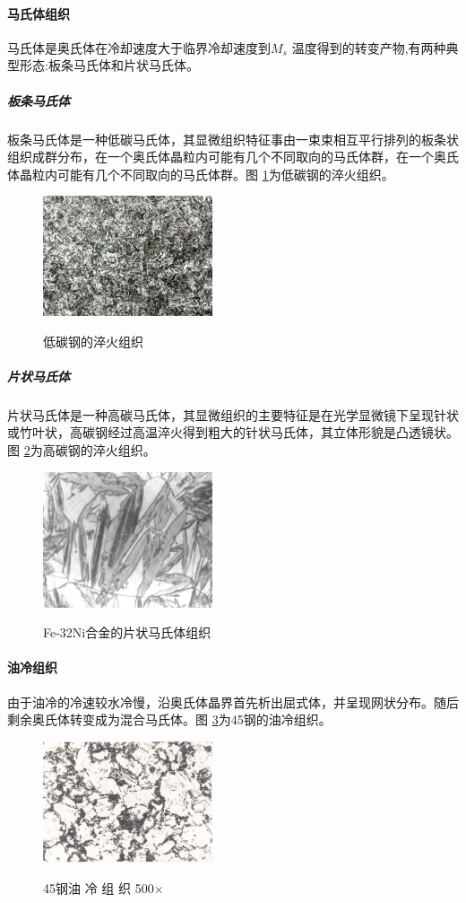 \documentclass[12pt]{ctexart}
\begin{document}
\paragraph{马氏体组织}
马氏体是奥氏体在冷却速度大于临界冷却速度到${M_{s}}$ 温度得到的转变产物,有两种典型形态:板条马氏体和片状马氏体。
\subparagraph{板条马氏体}
板条马氏体是一种低碳马氏体，其显微组织特征事由一束束相互平行排列的板条状组织成群分布，在一个奥氏体晶粒内可能有几个不同取向的马氏体群，在一个奥氏体晶粒内可能有几个不同取向的马氏体群。图 \ref{ditangangcuihuo}为低碳钢的淬火组织。
\begin{figure}[ht!]
  \centering
  \includegraphics[width=5cm]{bantiaomashiti.jpg}\\
  \caption{低碳钢的淬火组织}\label{ditangangcuihuo}
\end{figure}
\subparagraph{片状马氏体}
片状马氏体是一种高碳马氏体，其显微组织的主要特征是在光学显微镜下呈现针状或竹叶状，高碳钢经过高温淬火得到粗大的针状马氏体，其立体形貌是凸透镜状。图 \ref{gaotangangcuihuo}为高碳钢的淬火组织。
\begin{figure}[ht!]
  \centering
  \includegraphics[width=5cm]{pianzhuangmashiti.jpg}\\
  \caption{Fe-32Ni合金的片状马氏体组织}\label{gaotangangcuihuo}
\end{figure}
\paragraph{油冷组织}
由于油冷的冷速较水冷慢，沿奥氏体晶界首先析出屈式体，并呈现网状分布。随后剩余奥氏体转变成为混合马氏体。图 \ref{youlengcuihuo}为45钢的油冷组织。
\begin{figure}[ht!]
  \centering
  \includegraphics[width=5cm]{youlengcuihuo.jpg}\\
  \caption{45钢油 冷 组 织 500×}\label{youlengcuihuo}
\end{figure}
\end{document}
